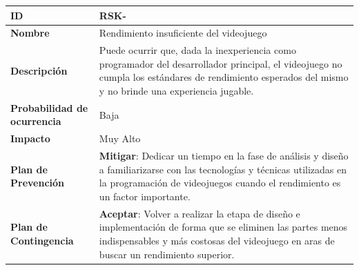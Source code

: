 \begin{center}
	\begin{tabular}{ | p{5.6cm} | p{8.5cm} | } 
		\hline
		
		\textbf{ID} & RSK-\arabic{contador_riesgos}
		{contador_riesgos} \\
		
		\hline 
		\textbf{Nombre} &
		Rendimiento insuficiente del videojuego\\ 
		
		\hline
		\textbf{Descripción} & 
		Puede ocurrir que, dada la inexperiencia como programador del desarrollador principal, el videojuego no cumpla los estándares de rendimiento esperados del mismo y no brinde una experiencia jugable.\\
		
		\hline 
		\textbf{Probabilidad de ocurrencia} &
		Baja\\
		
		\hline 
		\textbf{Impacto} &
		Muy Alto\\
		
		\hline 
		\textbf{Plan de Prevención} &
		\textbf{Mitigar}: Dedicar un tiempo en la fase de análisis y diseño a familiarizarse con las tecnologías y técnicas utilizadas en la programación de videojuegos cuando el rendimiento es un factor importante.\\
		
		\hline 
		\textbf{Plan de Contingencia} &
		\textbf{Aceptar}: Volver a realizar la etapa de diseño e implementación de forma que se eliminen las partes menos indispensables y más costosas del videojuego en aras de buscar un rendimiento superior.\\
		
		
		\hline
	\end{tabular}
\end{center}

